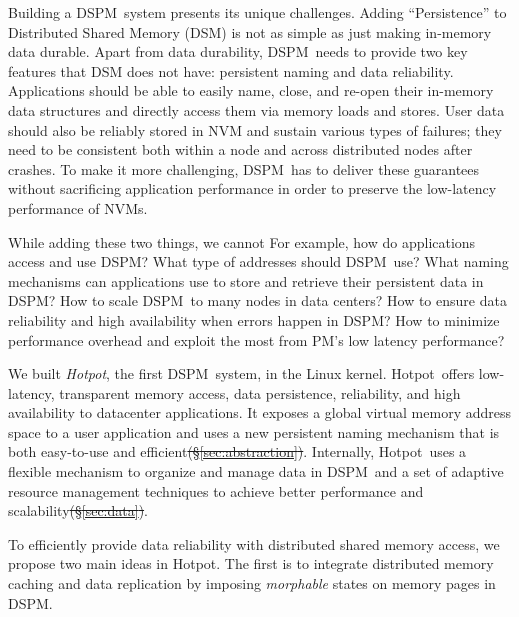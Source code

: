 \documentclass[sigconf]{acmart}
\renewcommand{\em}{\it}
\newcommand{\eg}{\textit{e.g.}}
\newcommand{\dsnvm}{DSPM}
\newcommand{\nvm}{PM}
\newcommand{\hotpot}{Hotpot}
\providecommand{\DIFdel}[1]{{\protect\color{red}\sout{#1}}}                      %
\providecommand{\DIFdelbegin}{} %
\providecommand{\DIFdelend}{} %
\begin{document}
Building a \dsnvm\ system presents its unique challenges.
Adding ``Persistence'' to Distributed Shared Memory (DSM)
is not as simple as just making in-memory data durable.
Apart from data durability, \dsnvm\ needs to provide two key features that DSM does not have:
persistent naming and data reliability.
Applications should be able to easily
name, close, and re-open their in-memory data structures 
and directly access them via memory loads and stores.
User data should also be reliably stored in NVM and sustain various types of failures; %
they need to be consistent both within a node and across distributed nodes after crashes.
To make it more challenging, 
\dsnvm\ has to deliver these guarantees without sacrificing application performance
in order to preserve the low-latency performance of NVMs.

While adding these two things, we cannot
For example, how do applications access and use \dsnvm? 
What type of addresses should \dsnvm\ use? 
What naming mechanisms can applications use to store and retrieve their persistent data in \dsnvm?
How to scale \dsnvm\ to many nodes in data centers?
How to ensure data reliability and high availability when errors happen in \dsnvm?
How to minimize performance overhead and exploit the most from \nvm's low latency performance?
\fi

We built {\em \hotpot}, the first \dsnvm\ system, in the Linux kernel.
\hotpot\ offers low-latency, transparent memory access, data persistence, reliability, and
high availability to datacenter applications.
It exposes a global virtual memory address space to a user application
and uses a new persistent naming mechanism that is both easy-to-use and efficient\DIFdelbegin \DIFdel{(\S\ref{sec:abstraction})}\DIFdelend .
Internally, \hotpot\ uses a flexible mechanism to organize and manage data in \dsnvm\
and a set of adaptive resource management techniques to achieve 
better performance and scalability\DIFdelbegin \DIFdel{(\S\ref{sec:data})}\DIFdelend .

To efficiently provide data reliability with distributed shared memory access, 
we propose two main ideas in \hotpot.
The first is to integrate distributed memory caching and data replication 
by imposing {\em morphable} states on memory pages in \dsnvm.
\end{document}
